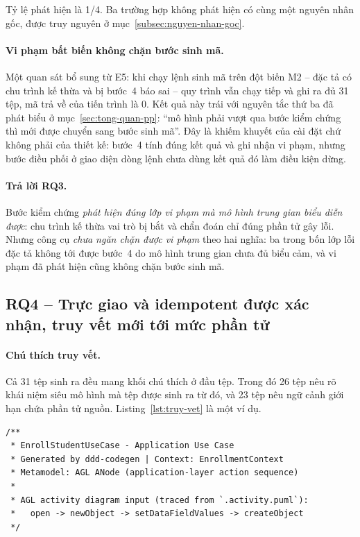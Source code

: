 Tỷ lệ phát hiện là 1/4. Ba trường hợp không phát hiện có cùng một nguyên nhân gốc, được truy nguyên ở mục~\ref{subsec:nguyen-nhan-goc}.

\paragraph{Vi phạm bất biến không chặn bước sinh mã.}
Một quan sát bổ sung từ E5: khi chạy lệnh sinh mã trên đột biến M2 -- đặc tả có chu trình kế thừa và bị bước~4 báo sai -- quy trình vẫn chạy tiếp và ghi ra đủ 31 tệp, mã trả về của tiến trình là 0. Kết quả này trái với nguyên tắc thứ ba đã phát biểu ở mục~\ref{sec:tong-quan-pp}: ``mô hình phải vượt qua bước kiểm chứng thì mới được chuyển sang bước sinh mã''. Đây là khiếm khuyết của cài đặt chứ không phải của thiết kế: bước~4 tính đúng kết quả và ghi nhận vi phạm, nhưng bước điều phối ở giao diện dòng lệnh chưa dùng kết quả đó làm điều kiện dừng.

\paragraph{Trả lời RQ3.}
Bước kiểm chứng \emph{phát hiện đúng lớp vi phạm mà mô hình trung gian biểu diễn được}: chu trình kế thừa vai trò bị bắt và chẩn đoán chỉ đúng phần tử gây lỗi. Nhưng công cụ \emph{chưa ngăn chặn được vi phạm} theo hai nghĩa: ba trong bốn lớp lỗi đặc tả không tới được bước~4 do mô hình trung gian chưa đủ biểu cảm, và vi phạm đã phát hiện cũng không chặn bước sinh mã.

\subsection{RQ4 -- Trực giao và idempotent được xác nhận, truy vết mới tới mức phần tử}

\paragraph{Chú thích truy vết.}
Cả 31 tệp sinh ra đều mang khối chú thích ở đầu tệp. Trong đó 26 tệp nêu rõ khái niệm siêu mô hình mà tệp được sinh ra từ đó, và 23 tệp nêu ngữ cảnh giới hạn chứa phần tử nguồn. Listing~\ref{lst:truy-vet} là một ví dụ.

\begin{lstlisting}[caption={Chú thích truy vết ở đầu một tệp sinh ra},label={lst:truy-vet}]
/**
 * EnrollStudentUseCase - Application Use Case
 * Generated by ddd-codegen | Context: EnrollmentContext
 * Metamodel: AGL ANode (application-layer action sequence)
 *
 * AGL activity diagram input (traced from `.activity.puml`):
 *   open -> newObject -> setDataFieldValues -> createObject
 */
\end{lstlisting}

